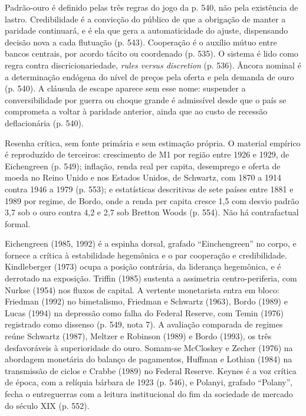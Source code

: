
Padrão-ouro é definido pelas três regras do jogo da p. 540, não pela existência de
lastro. Credibilidade é a convicção do público de que a obrigação de manter a
paridade continuará, e é ela que gera a automaticidade do ajuste, dispensando
decisão nova a cada flutuação (p. 543). Cooperação é o auxílio mútuo entre bancos
centrais, por acordo tácito ou coordenado (p. 535). O sistema é lido como regra
contra discricionariedade, \textit{rules versus discretion} (p. 536). Âncora
nominal é a determinação endógena do nível de preços pela oferta e pela demanda de
ouro (p. 540). A cláusula de escape aparece sem esse nome: suspender a
conversibilidade por guerra ou choque grande é admissível desde que o país se
comprometa a voltar à paridade anterior, ainda que ao custo de recessão
deflacionária (p. 540).

Resenha crítica, sem fonte primária e sem estimação própria. O material empírico é
reproduzido de terceiros: crescimento de M1 por região entre 1926 e 1929, de
Eichengreen (p. 549); inflação, renda real per capita, desemprego e oferta de
moeda no Reino Unido e nos Estados Unidos, de Schwartz, com 1870 a 1914 contra
1946 a 1979 (p. 553); e estatísticas descritivas de sete países entre 1881 e 1989
por regime, de Bordo, onde a renda per capita cresce 1,5 com desvio padrão 3,7 sob
o ouro contra 4,2 e 2,7 sob Bretton Woods (p. 554). Não há contrafactual formal.

Eichengreen (1985, 1992) é a espinha dorsal, grafado ``Einchengreen'' no corpo, e
fornece a crítica à estabilidade hegemônica e o par cooperação e credibilidade.
Kindleberger (1973) ocupa a posição contrária, da liderança hegemônica, e é
derrotado na exposição. Triffin (1985) sustenta a assimetria centro-periferia, com
Nurkse (1954) nos fluxos de capital. A vertente monetarista entra em bloco:
Friedman (1992) no bimetalismo, Friedman e Schwartz (1963), Bordo (1989) e Lucas
(1994) na depressão como falha do Federal Reserve, com Temin (1976) registrado
como dissenso (p. 549, nota 7). A avaliação comparada de regimes reúne Schwartz
(1987), Meltzer e Robinson (1989) e Bordo (1993), os três desfavoráveis à
superioridade do ouro. Somam-se McCloskey e Zecher (1976) na abordagem monetária
do balanço de pagamentos, Huffman e Lothian (1984) na transmissão de ciclos e
Crabbe (1989) no Federal Reserve. Keynes é a voz crítica de época, com a relíquia
bárbara de 1923 (p. 546), e Polanyi, grafado ``Polany'', fecha o entreguerras com
a leitura institucional do fim da sociedade de mercado do século XIX (p. 552).

